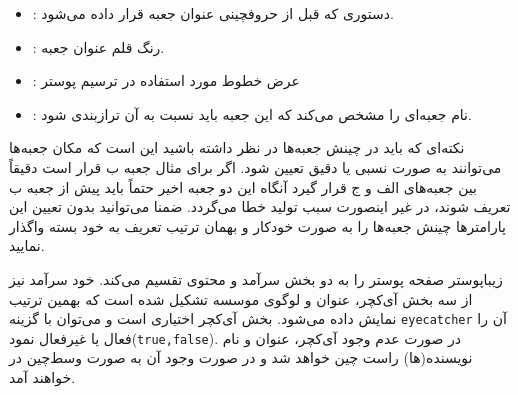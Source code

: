 \documentclass[debug,a0paper,persian]{xebaposter}
\begin{document}
\begin{poster}
\begin{posterbox}[name=posterboxoption,column=1,span=2,below=posteroption,textborder=none
,headershape=rectangle,headerborder=none,textborder=coils]
\begin{itemize}
    \item {}:
    دستوری که قبل از حروفچینی عنوان جعبه قرار داده می‌شود.
    \item {}:
    رنگ قلم عنوان جعبه.
    \item {}:
    عرض خطوط مورد استفاده در ترسیم پوستر
    \item {}: 
    نام جعبه‌ای را مشخص می‌کند که این جعبه باید نسبت به آن ترازبندی شود.
\end{itemize}
\vspace{-2mm}
    نکته‌ای که باید در چینش جعبه‌ها در نظر داشته باشید این است که مکان جعبه‌ها می‌توانند به صورت نسبی یا دقیق تعیین شود. 
    اگر برای مثال جعبه ب قرار است دقیقاً بین جعبه‌های الف و ج قرار گیرد 
    آنگاه این دو جعبه اخیر حتماً باید پیش از جعبه ب تعریف شوند، در غیر اینصورت سبب تولید خطا می‌گردد. ضمنا می‌توانید بدون 
    تعیین این پارامترها چینش جعبه‌ها را به صورت خودکار و بهمان ترتیب تعریف به خود بسته واگذار نمایید.
\end{posterbox}
\begin{posterbox}[name=imagedataset,column=0,span=1,below=introduction,textborder=roundedleft]
{}
زیباپوستر صفحه پوستر را به دو بخش سرآمد  و محتوی تقسیم می‌کند. خود سرآمد نیز از سه بخش آی‌کچر، عنوان و لوگوی موسسه تشکیل 
شده است که بهمین ترتیب نمایش داده می‌شود. بخش آی‌کچر اختیاری است و می‌توان با گزینه \texttt{eyecatcher} آن را فعال یا غیرفعال 
نمود(\texttt{true,false}). در صورت عدم وجود آی‌کچر، عنوان و نام نویسنده‌(ها) راست چین خواهد شد و در صورت وجود آن به صورت 
وسط‌چین در خواهند آمد.


\end{posterbox}
\end{poster}
\end{document}
